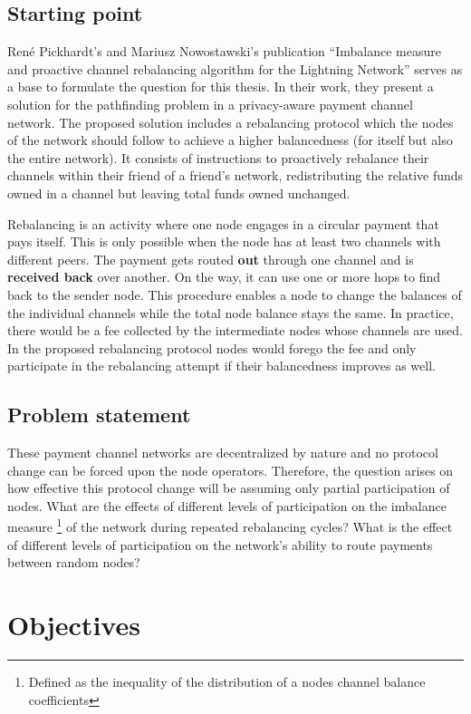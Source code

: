 \documentclass[final]{fhnwreport}       %
\begin{document}
\subsection{Starting point}
René Pickhardt's and Mariusz Nowostawski's publication ``Imbalance measure and proactive channel rebalancing algorithm for the Lightning Network'' \cite{pickhardt_imbalance_2019} serves as a base to formulate the question for this thesis. In their work, they present a solution for the pathfinding problem in a privacy-aware payment channel network. The proposed solution includes a rebalancing protocol which the nodes of the network should follow to achieve a higher balancedness (for itself but also the entire network). It consists of instructions to proactively rebalance their channels within their friend of a friend's network, redistributing the relative funds owned in a channel but leaving total funds owned unchanged.

Rebalancing is an activity where one node engages in a circular payment that pays itself. This is only possible when the node has at least two channels with different peers. The payment gets routed \textbf{out} through one channel and is \textbf{received back} over another. On the way, it can use one or more hops to find back to the sender node. This procedure enables a node to change the balances of the individual channels while the total node balance stays the same. In practice, there would be a fee collected by the intermediate nodes whose channels are used. In the proposed rebalancing protocol nodes would forego the fee and only participate in the rebalancing attempt if their balancedness improves as well.

\subsection{Problem statement}
These payment channel networks are decentralized by nature and no protocol change can be forced upon the node operators. Therefore, the question arises on how effective this protocol change will be assuming only partial participation of nodes. What are the effects of different levels of participation on the imbalance measure \footnote{Defined as the inequality of the distribution of a nodes channel balance coefficients} of the network during repeated rebalancing cycles? What is the effect of different levels of participation on the network's ability to route payments between random nodes? 

\section{Objectives}
\end{document}
